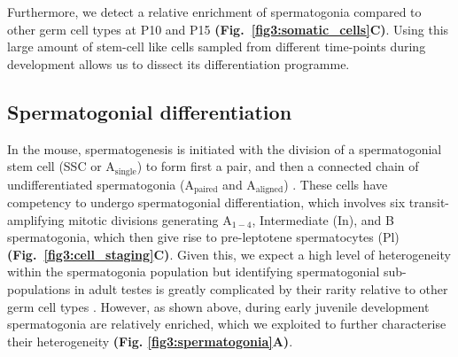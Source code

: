 Furthermore, we detect a relative enrichment of spermatogonia compared to other germ cell types at P10 and P15 \textbf{(Fig.~\ref{fig3:somatic_cells}C)}. Using this large amount of stem-cell like cells sampled from different time-points during development allows us to dissect its differentiation programme.

\newpage

\subsection{Spermatogonial differentiation}

In the mouse, spermatogenesis is initiated with the division of a spermatogonial stem cell (SSC or A$_{\text{single}}$) to form first a pair, and then a connected chain of undifferentiated spermatogonia (A$_{\text{paired}}$ and A$_{\text{aligned}}$) \citep{Oakberg1971, DeRooij1973}. These cells have competency to undergo spermatogonial differentiation, which involves six transit-amplifying mitotic divisions generating A$_{1-4}$, Intermediate (In), and B spermatogonia, which then give rise to pre-leptotene spermatocytes (Pl) \citep{DeRooij2000} \textbf{(Fig.~\ref{fig3:cell_staging}C)}. Given this, we expect a high level of heterogeneity within the spermatogonia population but identifying spermatogonial sub-populations in adult testes is greatly complicated by their rarity relative to other germ cell types \citep{Lukassen2018}. However, as shown above, during early juvenile development spermatogonia are relatively enriched, which we exploited to further characterise their heterogeneity \textbf{(Fig. \ref{fig3:spermatogonia}A)}. \\

